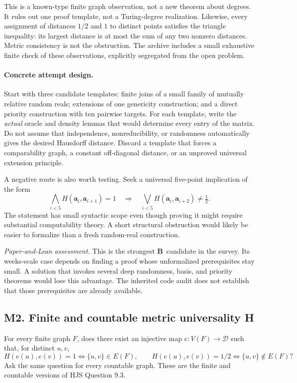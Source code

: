 \documentclass[11pt,a4paper]{article}
\newcommand{\D}{\mathcal D}
\newcommand{\adeg}{\mathbf a}\newcommand{\bdeg}{\mathbf b}
\newcommand{\Wmark}{\textbf{B}}\newcommand{\Pmark}{\textbf{R}}\newcommand{\Lmark}{\textbf{H}}
\newcommand{\assessment}[1]{\par\noindent\textit{Paper-and-Lean assessment.} #1\par}
\theoremstyle{definition}\newtheorem{definition}[theorem]{Definition}
\theoremstyle{remark}\newtheorem{remark}[theorem]{Remark}
\begin{document}
This is a known-type finite graph observation, not a new theorem about degrees. It rules out one proof template, not a Turing-degree realization. Likewise, every assignment of distances $1/2$ and $1$ to distinct points satisfies the triangle inequality: its largest distance is at most the sum of any two nonzero distances. Metric consistency is not the obstruction. The archive includes a small exhaustive finite check of these observations, explicitly segregated from the open problem.

\paragraph{Concrete attempt design.}
Start with three candidate templates: finite joins of a small family of mutually relative random reals; extensions of one genericity construction; and a direct priority construction with ten pairwise targets. For each template, write the \emph{actual} oracle and density lemmas that would determine every entry of the matrix. Do not assume that independence, nonreducibility, or randomness automatically gives the desired Hausdorff distance. Discard a template that forces a comparability graph, a constant off-diagonal distance, or an unproved universal extension principle.

A negative route is also worth testing. Seek a universal five-point implication of the form
\[
 \bigwedge_{i<5} H(\adeg_i,\adeg_{i+1})=1
 \quad\Longrightarrow\quad
 \bigvee_{i<5}H(\adeg_i,\adeg_{i+2})\ne\tfrac12.
\]
The statement has small syntactic scope even though proving it might require substantial computability theory. A short structural obstruction would likely be easier to formalize than a fresh random-real construction.

\assessment{This is the strongest \Wmark\ candidate in the survey. Its weeks-scale case depends on finding a proof whose unformalized prerequisites stay small. A solution that invokes several deep randomness, basis, and priority theorems would lose this advantage. The inherited code audit does not establish that those prerequisites are already available.}

\subsection{M2. Finite and countable metric universality \Lmark}
\label{entry:M2}

For every finite graph $F$, does there exist an injective map $e:V(F)\to\D$ such that, for distinct $u,v$,
\[
 H(e(u),e(v))=1 \iff \{u,v\}\in E(F),
 \qquad H(e(u),e(v))=1/2 \iff \{u,v\}\notin E(F)?
\]
Ask the same question for every countable graph. These are the finite and countable versions of HJS Question 9.3.\cite{HJS}
\end{document}
